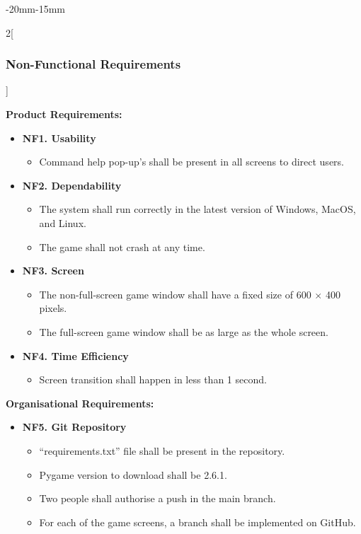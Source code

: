 \documentclass[12pt]{article}
\begin{document}
\begin{adjustwidth}{-20mm}{-15mm}
\begin{multicols}{2}[\subsubsection{Non-Functional Requirements}]
\raggedcolumns

\noindent\textbf{Product Requirements:}
\begin{itemize}[leftmargin=*]
\item \textbf{NF1. Usability}
\begin{itemize}[leftmargin=*]
\item Command help pop-up's shall be present in all screens to direct users.
\end{itemize}

\item \textbf{NF2. Dependability}
\begin{itemize}[leftmargin=*]
\item The system shall run correctly in the latest version of Windows, MacOS, and Linux.
\item The game shall not crash at any time.
\end{itemize}

\item \textbf{NF3. Screen}
\begin{itemize}[leftmargin=*]
\item The non-full-screen game window shall have a fixed size of 600 $\times$ 400 pixels.
\item The full-screen game window shall be as large as the whole screen.
\end{itemize}

\item \textbf{NF4. Time Efficiency}
\begin{itemize}[leftmargin=*]
\item Screen transition shall happen in less than 1 second.
\end{itemize}
\end{itemize}

\vspace{6pt}
\noindent\textbf{Organisational Requirements:}
\begin{itemize}[leftmargin=*]
\item \textbf{NF5. Git Repository}
\begin{itemize}[leftmargin=*]
\item ``requirements.txt'' file shall be present in the repository.
\item Pygame version to download shall be 2.6.1.
\item Two people shall authorise a push in the main branch.
\item For each of the game screens, a branch shall be implemented on GitHub.
\end{itemize}


\end{itemize}
\end{multicols}
\end{adjustwidth}
\end{document}
